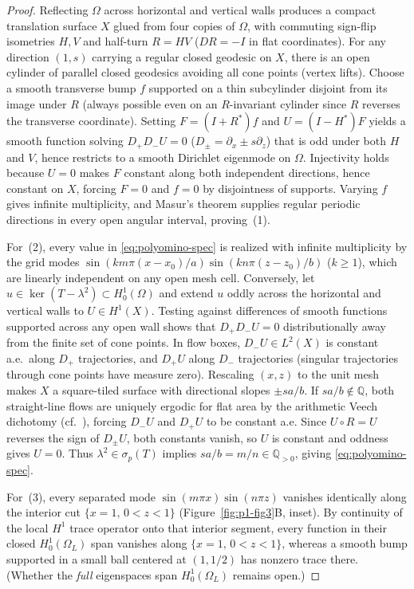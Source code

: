 \documentclass[11pt,reqno]{amsart}
\theoremstyle{definition}
\theoremstyle{remark}
\newcommand{\Q}{\mathbb{Q}}
\begin{document}
\begin{proof}
Reflecting $\Omega$ across horizontal and vertical walls produces a compact translation surface $X$ glued from four copies of $\Omega$, with commuting sign-flip isometries $H, V$ and half-turn $R = HV$ ($DR = -I$ in flat coordinates). For any direction $(1,s)$ carrying a regular closed geodesic on $X$, there is an open cylinder of parallel closed geodesics avoiding all cone points (vertex lifts). Choose a smooth transverse bump $f$ supported on a thin subcylinder disjoint from its image under $R$ (always possible even on an $R$-invariant cylinder since $R$ reverses the transverse coordinate). Setting $F = (I + R^*)f$ and $U = (I - H^*)F$ yields a smooth function solving $D_+ D_- U = 0$ ($D_\pm = \partial_x \pm s\partial_z$) that is odd under both $H$ and $V$, hence restricts to a smooth Dirichlet eigenmode on $\Omega$. Injectivity holds because $U = 0$ makes $F$ constant along both independent directions, hence constant on $X$, forcing $F = 0$ and $f = 0$ by disjointness of supports. Varying $f$ gives infinite multiplicity, and Masur's theorem \cite[Thms.~1--2]{Masur1986} supplies regular periodic directions in every open angular interval, proving~(1).

For~(2), every value in \eqref{eq:polyomino-spec} is realized with infinite multiplicity by the grid modes $\sin(k m\pi(x-x_0)/a)\sin(k n\pi(z-z_0)/b)$ ($k \ge 1$), which are linearly independent on any open mesh cell. Conversely, let $u \in \ker(T - \lambda^2) \subset H_0^1(\Omega)$ and extend $u$ oddly across the horizontal and vertical walls to $U \in H^1(X)$. Testing against differences of smooth functions supported across any open wall shows that $D_+ D_- U = 0$ distributionally away from the finite set of cone points. In flow boxes, $D_- U \in L^2(X)$ is constant a.e.\ along $D_+$ trajectories, and $D_+ U$ along $D_-$ trajectories (singular trajectories through cone points have measure zero). Rescaling $(x,z)$ to the unit mesh makes $X$ a square-tiled surface with directional slopes $\pm s a/b$. If $sa/b \notin \Q$, both straight-line flows are uniquely ergodic for flat area by the arithmetic Veech dichotomy (cf.\ \cite[\S 1 and App.~C]{HubertLelievre2006}), forcing $D_- U$ and $D_+ U$ to be constant a.e. Since $U \circ R = U$ reverses the sign of $D_\pm U$, both constants vanish, so $U$ is constant and oddness gives $U = 0$. Thus $\lambda^2 \in \sigma_p(T)$ implies $sa/b = m/n \in \Q_{>0}$, giving \eqref{eq:polyomino-spec}.

For~(3), every separated mode $\sin(m\pi x)\sin(n\pi z)$ vanishes identically along the interior cut $\{x = 1,\, 0 < z < 1\}$ (Figure~\ref{fig:p1-fig3}B, inset). By continuity of the local $H^1$ trace operator onto that interior segment, every function in their closed $H_0^1(\Omega_L)$ span vanishes along $\{x = 1,\, 0 < z < 1\}$, whereas a smooth bump supported in a small ball centered at $(1, 1/2)$ has nonzero trace there. (Whether the \emph{full} eigenspaces span $H_0^1(\Omega_L)$ remains open.)
\end{proof}
\end{document}
